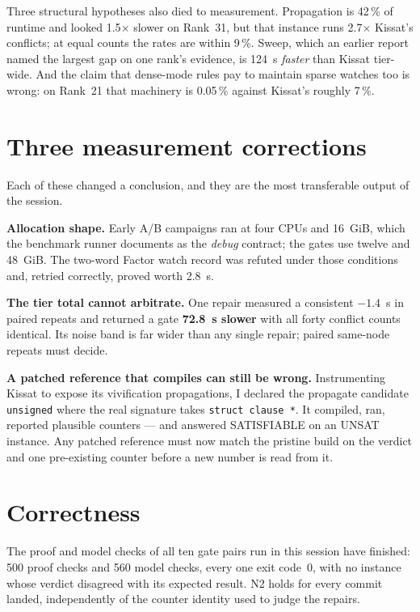 \documentclass[11pt]{article}
\newcommand{\code}[1]{\texttt{#1}}
\begin{document}
Three structural hypotheses also died to measurement. Propagation is 42\,\% of
runtime and looked 1.5$\times$ slower on Rank~31, but that instance runs
2.7$\times$ Kissat's conflicts; at equal counts the rates are within 9\,\%.
Sweep, which an earlier report named the largest gap on one rank's evidence, is
124~s \emph{faster} than Kissat tier-wide. And the claim that dense-mode rules
pay to maintain sparse watches too is wrong: on Rank~21 that machinery is
0.05\,\% against Kissat's roughly 7\,\%.

\section{Three measurement corrections}

Each of these changed a conclusion, and they are the most transferable output
of the session.

\textbf{Allocation shape.} Early A/B campaigns ran at four CPUs and 16~GiB,
which the benchmark runner documents as the \emph{debug} contract; the gates use
twelve and 48~GiB. The two-word Factor watch record was refuted under those
conditions and, retried correctly, proved worth 2.8~s.

\textbf{The tier total cannot arbitrate.} One repair measured a consistent
$-1.4$~s in paired repeats and returned a gate \textbf{72.8~s slower} with all
forty conflict counts identical. Its noise band is far wider than any single
repair; paired same-node repeats must decide.

\textbf{A patched reference that compiles can still be wrong.} Instrumenting
Kissat to expose its vivification propagations, I declared the propagate
candidate \code{unsigned} where the real signature takes \code{struct clause *}.
It compiled, ran, reported plausible counters --- and answered SATISFIABLE on an
UNSAT instance. Any patched reference must now match the pristine build on the
verdict and one pre-existing counter before a new number is read from it.

\section{Correctness}

The proof and model checks of all ten gate pairs run in this session have
finished: 500 proof checks and 560 model checks, every one exit code~0, with no
instance whose verdict disagreed with its expected result. N2 holds for every
commit landed, independently of the counter identity used to judge the repairs.
\end{document}
